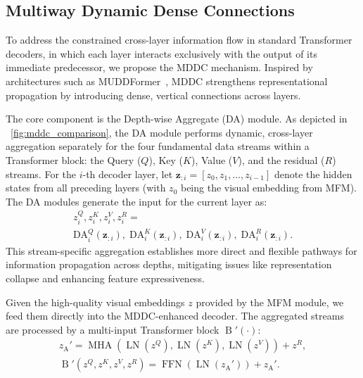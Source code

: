 \documentclass[lettersize,journal]{IEEEtran}
\begin{document}
	\subsection{Multiway Dynamic Dense Connections}
	
	To address the constrained cross-layer information flow in standard Transformer decoders, in which each layer interacts exclusively with the output of its immediate predecessor, we propose the MDDC mechanism. Inspired by architectures such as MUDDFormer~\cite{xiao2025muddformer}, MDDC strengthens representational propagation by introducing dense, vertical connections across layers.
	
	The core component is the Depth-wise Aggregate (DA) module. As depicted in \figurename~\ref{fig:mddc_comparison}, the DA module performs dynamic, cross-layer aggregation separately for the four fundamental data streams within a Transformer block: the Query (\(Q\)), Key (\(K\)), Value (\(V\)), and the residual (\(R\)) streams. For the \(i\)-th decoder layer, let \(\mathbf{z}_{:i} = [z_0, z_1, \dots, z_{i-1}]\) denote the hidden states from all preceding layers (with \(z_0\) being the visual embedding from MFM). The DA modules generate the input for the current layer as:
	\begin{equation} \label{eq:multiway_dense}
		\begin{gathered}
			z_{i}^{Q}, z_{i}^{K}, z_{i}^{V}, z_{i}^{R}= \\
			\mathrm{DA}_{i}^{Q}(\mathbf{z}_{:i}),\;\mathrm{DA}_{i}^{K}(\mathbf{z}_{:i}),\;\mathrm{DA}_{i}^{V}(\mathbf{z}_{:i}),\;\mathrm{DA}_{i}^{R}(\mathbf{z}_{:i}).
		\end{gathered}
	\end{equation}
	This stream-specific aggregation establishes more direct and flexible pathways for information propagation across depths, mitigating issues like representation collapse and enhancing feature expressiveness.
	
	Given the high-quality visual embeddings \(z\) provided by the MFM module, we feed them directly into the MDDC-enhanced decoder. The aggregated streams are processed by a multi-input Transformer block \(\operatorname{B}'(\cdot)\):
	\begin{equation} \label{eq:multi-input_block}
		\begin{gathered}
			z_{\text{A}}' = \operatorname{MHA}(\operatorname{LN}(z^Q), \operatorname{LN}(z^K), \operatorname{LN}(z^V)) + z^R, \\
			\operatorname{B}'(z^Q, z^K, z^V, z^R) = \operatorname{FFN}(\operatorname{LN}(z_{\text{A}}')) + z_{\text{A}}'.
		\end{gathered}
	\end{equation}
	
\end{document}
